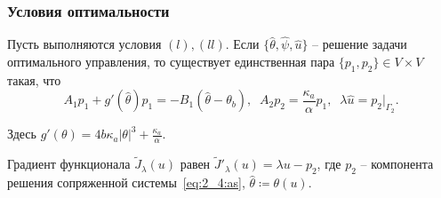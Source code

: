 \begin{frame}
    \frametitle{Условия оптимальности}
    \begin{theorem}[2.10]
        Пусть выполняются условия $(l), (ll)$.
        Если $\{\hat{\theta}, \hat{\psi}, \hat{u}\}$ -- решение
        задачи оптимального управления, то существует единственная пара
        $\{p_1, p_2 \} \in V\times V$ такая, что
        \begin{equation}
            \label{eq:2_4:as}
            A_1 p_1+g'(\hat{\theta}) p_1=-B_1(\hat{\theta} -\theta_b),\;\;
            A_2 p_2=\frac{\kappa_a}{\alpha}p_1,\;\;
            \lambda\hat{u}=p_2|_{\Gamma_2}.
        \end{equation}
    \end{theorem}
    Здесь $g'(\theta)=4b\kappa_a|\theta|^3+\frac{\kappa_a}{\alpha}$.

    \vspace{10mm}
    Градиент функционала $\tilde J_\lambda(u)$ равен
    $ \tilde J'_\lambda (u) = \lambda u - p_2$, где $p_2$ -- компонента решения сопряженной системы~\eqref{eq:2_4:as},
    $\hat{\theta}\coloneqq\theta(u)$.

\end{frame}


